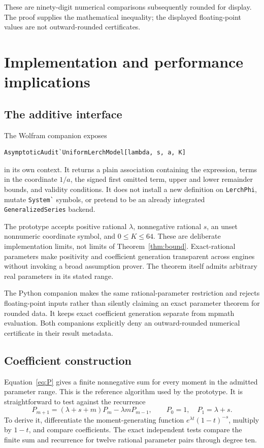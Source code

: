 \documentclass[11pt,a4paper]{article}
\newcommand{\code}[1]{\nolinkurl{#1}}
\begin{document}
These are ninety-digit numerical comparisons subsequently rounded for display.
The proof supplies the mathematical inequality; the displayed floating-point
values are not outward-rounded certificates.

\section{Implementation and performance implications}

\subsection{The additive interface}

The Wolfram companion exposes
\begin{lstlisting}
AsymptoticAudit`UniformLerchModel[lambda, s, a, K]
\end{lstlisting}
in its own context. It returns a plain association containing the expression,
terms in the coordinate $1/a$, the signed first omitted term, upper and lower
remainder bounds, and validity conditions. It does not install a new definition
on \code{LerchPhi}, mutate \code{System`} symbols, or pretend to be an already
integrated \code{GeneralizedSeries} backend.

The prototype accepts positive rational $\lambda$, nonnegative rational $s$,
an unset nonnumeric coordinate symbol, and $0\leq K\leq64$. These are deliberate
implementation limits, not limits of Theorem~\ref{thm:bound}. Exact-rational
parameters make positivity and coefficient generation transparent across
engines without invoking a broad assumption prover. The theorem itself admits
arbitrary real parameters in its stated range.

The Python companion makes the same rational-parameter restriction and rejects
floating-point inputs rather than silently claiming an exact parameter theorem
for rounded data. It keeps exact coefficient generation separate from mpmath
evaluation. Both companions explicitly deny an outward-rounded numerical
certificate in their result metadata.

\subsection{Coefficient construction}

Equation~\eqref{eq:P} gives a finite nonnegative sum for every moment in the
admitted parameter range. This is the reference algorithm used by the
prototype. It is straightforward to test against the recurrence
\begin{equation}
 P_{m+1}=(\lambda+s+m)P_m-\lambda mP_{m-1},\qquad
 P_0=1,\quad P_1=\lambda+s.
 \label{eq:recurrence}
\end{equation}
To derive it, differentiate the moment-generating function
$e^{\lambda t}(1-t)^{-s}$, multiply by $1-t$, and compare coefficients.
The exact independent tests compare the finite sum and recurrence for twelve
rational parameter pairs through degree ten.
\end{document}
